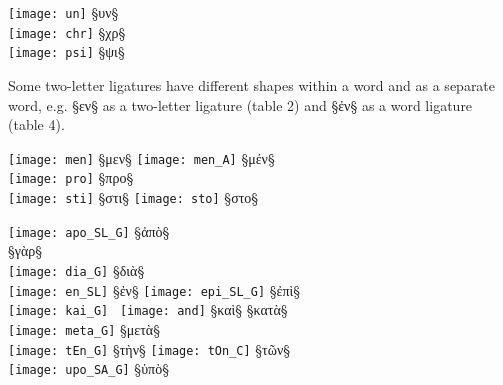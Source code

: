 \begin{liste}
 \texttt{[image: un]} §{υν}§ \\

 \texttt{[image: chr]} §{χρ}§ \\

\texttt{[image: psi]} §{ψι}§ \\

\end{liste}


\begin{note}
Some two-letter ligatures have different shapes within a word and as a separate word, e.g. §{εν}§ as a two-letter ligature (table 2) and §{ἐν}§ as a word ligature (table 4).
\end{note}


\begin{liste}

\texttt{[image: men]} §{μεν}§ \quad
\texttt{[image: men\_A]} §{μέν}§ \\

\texttt{[image: pro]} §{προ}§ \\

 \texttt{[image: sti]} §{στι}§ \quad
\texttt{[image: sto]} §{στο}§ \\

\end{liste}


\begin{liste}

\texttt{[image: apo\_SL\_G]} §{ἀπὸ}§ \\

 §{γὰρ}§ \\

 \texttt{[image: dia\_G]} §{διὰ}§ \\

\texttt{[image: en\_SL]} §{ἐν}§ \quad
\texttt{[image: epi\_SL\_G]} §{ἐπὶ}§ \\

 \texttt{[image: kai\_G]} \,
 \texttt{[image: and]} §{καὶ}§ \quad
{} §{κατὰ}§ \\

 \texttt{[image: meta\_G]} §{μετὰ}§ \\

\texttt{[image: tEn\_G]} §{τὴν}§ \quad
{} \texttt{[image: tOn\_C]} §{τῶν}§ \\

\texttt{[image: upo\_SA\_G]} §{ὑπὸ}§ \\

\end{liste}


